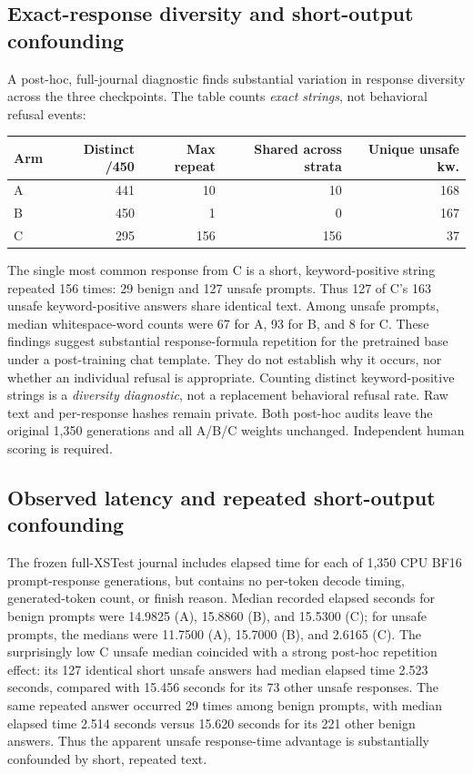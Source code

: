 \documentclass[11pt]{article}
\begin{document}
\subsection{Exact-response diversity and short-output confounding}
A post-hoc, full-journal diagnostic finds substantial variation in
response diversity across the three checkpoints. The table counts
\emph{exact strings}, not behavioral refusal events:
\begin{center}
\begin{tabular}{lrrrr}
\toprule
Arm & Distinct /450 & Max repeat & Shared across strata
    & Unique unsafe kw. \\
\midrule
A & 441 & 10 & 10 & 168 \\
B & 450 & 1 & 0 & 167 \\
C & 295 & 156 & 156 & 37 \\
\bottomrule
\end{tabular}
\end{center}
The single most common response from C is a short,
keyword-positive string repeated 156 times: 29 benign and
127 unsafe prompts. Thus 127 of C's 163 unsafe keyword-positive
answers share identical text. Among unsafe prompts, median
whitespace-word counts were 67 for A, 93 for B, and 8 for C.
These findings suggest substantial response-formula repetition for
the pretrained base under a post-training chat template. They
do not establish why it occurs, nor whether an individual refusal
is appropriate. Counting distinct keyword-positive strings is
a \emph{diversity diagnostic}, not a replacement behavioral
refusal rate. Raw text and per-response hashes remain private.
Both post-hoc audits leave the original 1,350 generations and
all A/B/C weights unchanged. Independent human scoring is required.

\subsection{Observed latency and repeated short-output confounding}
The frozen full-XSTest journal includes elapsed time for each
of 1,350 CPU BF16 prompt-response generations, but contains no
per-token decode timing, generated-token count, or finish reason.
Median recorded elapsed seconds for benign prompts were
14.9825 (A), 15.8860 (B), and 15.5300 (C); for unsafe prompts,
the medians were 11.7500 (A), 15.7000 (B), and 2.6165 (C).
The surprisingly low C unsafe median coincided with a strong
post-hoc repetition effect: its 127 identical short unsafe answers
had median elapsed time 2.523 seconds, compared with 15.456
seconds for its 73 other unsafe responses. The same repeated
answer occurred 29 times among benign prompts, with median
elapsed time 2.514 seconds versus 15.620 seconds for its 221
other benign answers. Thus the apparent unsafe response-time
advantage is substantially confounded by short, repeated text.
\end{document}
